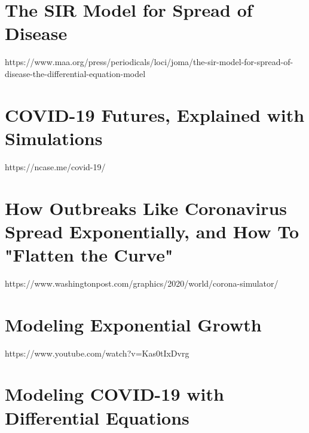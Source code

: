 \documentclass{amsart}
\theoremstyle{definition}
\numberwithin{equation}{section}
\begin{document}
\begin{sansmath}
\section{The SIR Model for Spread of Disease}
https://www.maa.org/press/periodicals/loci/joma/the-sir-model-for-spread-of-disease-the-differential-equation-model\\
\lipsum[0-2]

\section{COVID-19 Futures, Explained with Simulations}
https://ncase.me/covid-19/\\
\lipsum[3-5]

\section{How Outbreaks Like Coronavirus Spread Exponentially, and How To "Flatten the Curve"}
https://www.washingtonpost.com/graphics/2020/world/corona-simulator/\\
\lipsum[1-3]

\section{Modeling Exponential Growth}
https://www.youtube.com/watch?v=Kas0tIxDvrg\\
\lipsum[2-3]

\section{Modeling COVID-19 with Differential Equations}
\lipsum[3-4]
\end{sansmath}
\end{document}
